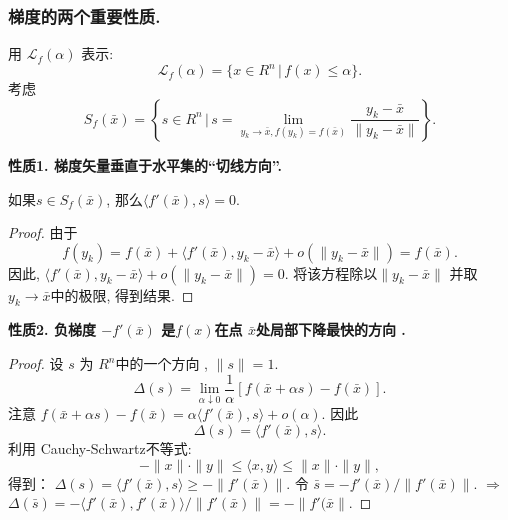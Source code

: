 \documentclass[handout]{beamer}
\begin{document}
\begin{frame}[allowframebreaks]


\frametitle{梯度的两个重要性质.}

用 $\mathcal{L}_f(\alpha)$ 表示:
$$
    \mathcal{L}_f(\alpha) = \{ x\in R^n \,|\, f(x)\leq \alpha \}.
$$
考虑
$$
    S_f(\bar{x}) = \left\{ s\in R^n \,|\,  s= \lim_{y_k\rightarrow \bar{x}, f(y_k)=f(\bar{x}) }^{}  \frac{y_k-\bar{x}}{\|y_k-\bar{x}\|} \right\}.
$$

\textbf{性质1.  梯度矢量垂直于水平集的“切线方向”.}

\begin{lemma}\label{lemma_1_2_1}

    如果$s\in S_f(\bar{x})$, 那么$\langle f'(\bar{x}), s\rangle =0$.

\end{lemma}

\begin{proof}
    由于
    $$
        f(y_k) = f(\bar{x}) + \langle f'(\bar{x}),y_k-\bar{x} \rangle + o(\|y_k-\bar{x}\|) = f(\bar{x}).
    $$
    因此, $\langle f'(\bar{x}),y_k-\bar{x} \rangle + o(\|y_k-\bar{x}\|) = 0$.
    将该方程除以$\|y_k-\bar{x}\|$ 并取$y_k \rightarrow \bar{x}$中的极限, 得到结果.
\end{proof}


\framebreak

\textbf{性质2. 负梯度 $-f'(\bar{x})$ 是$f(x)$在点 $\bar{x}$处局部下降最快的方向 .
}

\begin{proof} 
设 $s$ 为 $R^n$中的一个方向 , $\|s\| = 1$.
$$
    \Delta(s) = \lim_{\alpha \downarrow 0}^{} \frac{1}{\alpha} [f(\bar{x}+\alpha s) - f(\bar{x})].
$$
注意 $f(\bar{x}+\alpha s) - f(\bar{x}) = \alpha \langle f'(\bar{x}),s\rangle + o(\alpha)$.
因此
$$
    \Delta(s) = \langle f'(\bar{x}), s\rangle.
$$
利用 Cauchy-Schwartz不等式:
$$
    -\|x\| \cdot \|y\| \leq \langle x,y\rangle \leq \|x\|\cdot \|y\|,
$$
得到： $\Delta(s) = \langle f'(\bar{x}), s \rangle \geq -\|f'(\bar{x})\|$. 令
$ 
    \bar{s} = - f'(\bar{x})/\|f'(\bar{x})\|.
$ 
$\Rightarrow$
$ 
    \Delta(\bar{s}) = - \langle f'(\bar{x}), f'(\bar{x}) \rangle / \|f'(\bar{x})\| = - \|f'(\bar{x}\|.
$ 
\end{proof}

\end{frame}
\end{document}
